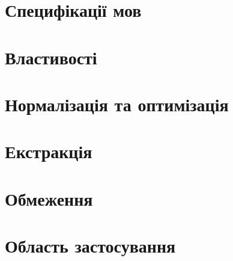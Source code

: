 \section{Специфікації мов}
\section{Властивості}
\section{Нормалізація та оптимізація}
\section{Екстракція}
\section{Обмеження}
\section{Область застосування}

